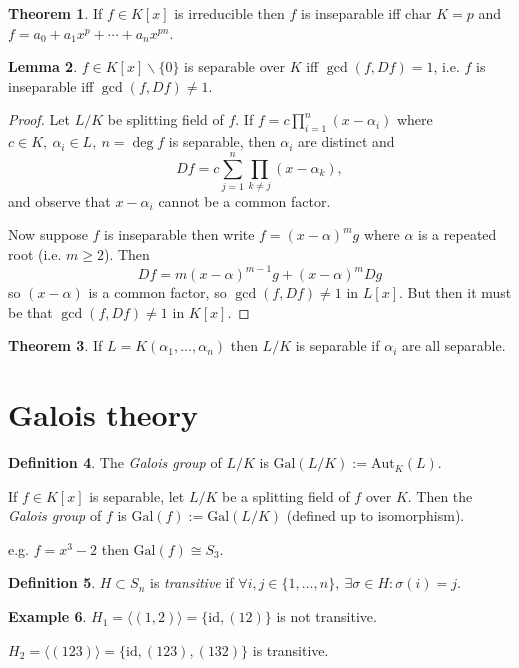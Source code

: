 \documentclass[a4paper]{article}
\newcommand{\gal}{\text{Gal}}
\newcommand{\Aut}{\text{Aut}}
\newcommand{\id}{\text{id}}
\theoremstyle{definition}
\newtheorem{defn}{Definition}[subsection]
\newtheorem{thm}[defn]{Theorem}
\newtheorem{lemma}[defn]{Lemma}
\newtheorem{example}[defn]{Example}
\begin{document}
\begin{thm}
If $f\in K[x]$ is irreducible then $f$ is inseparable iff $\text{char }K=p$ and $f=a_0+a_1 x^p +\cdots +a_n x^{pn}$.
\end{thm}

\begin{lemma}
\label{lemma:separableifffDfcoprime}
$f\in K[x]\backslash \{0\}$ is separable over $K$ iff $\gcd(f,Df)=1$, i.e. $f$ is inseparable iff $\gcd(f,Df)\neq 1$.
\end{lemma}
\begin{proof}
Let $L/K$ be splitting field of $f$. If $f=c\prod_{i=1}^n (x-\alpha_i)$ where $c\in K,\ \alpha_i\in L,\ n=\deg f$ is separable, then $\alpha_i$ are distinct and
\[
Df=c\sum_{j=1}^n \prod_{k\neq j} (x-\alpha_k),
\]
and observe that $x-\alpha_i$ cannot be a common factor.

Now suppose $f$ is inseparable then write $f=(x-\alpha)^mg$ where $\alpha$ is a repeated root (i.e. $m\geq 2$). Then
\[
Df=m(x-\alpha)^{m-1}g+(x-\alpha)^m Dg
\]
so $(x-\alpha)$ is a common factor, so $\gcd (f,Df)\neq 1$ in $L[x]$. But then it must be that $\gcd(f,Df)\neq 1$ in $K[x]$.
\end{proof}

\begin{thm}
If $L=K(\alpha_1,\ldots,\alpha_n)$ then $L/K$ is separable if $\alpha_i$ are all separable.
\end{thm}

\section{Galois theory}
\begin{defn}
The \textit{Galois group} of $L/K$ is $\gal(L/K):=\Aut_K(L)$.

If $f\in K[x]$ is separable, let $L/K$ be a splitting field of $f$ over $K$. Then the \textit{Galois group} of $f$ is $\gal(f):=\gal(L/K)$ (defined up to isomorphism).
\end{defn}
e.g. $f=x^3-2$ then $\gal(f)\cong S_3$.

\begin{defn}
$H\subset S_n$ is \textit{transitive} if $\forall i,j\in \{1,\ldots,n\},\ \exists\sigma\in H:\sigma(i)=j$.
\end{defn}
\begin{example}
$H_1=\langle (1,2)\rangle=\{\id, (1 2)\}$ is not transitive.

$H_2=\langle(123)\rangle=\{\id,(123),(132)\}$ is transitive.
\end{example}
\end{document}
